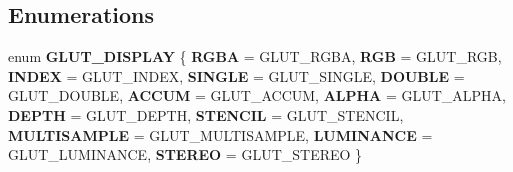 \subsection*{Enumerations}
\begin{DoxyCompactItemize}
\item 
\mbox{\label{namespacetwod_a34520984b2b88af95d23ce0752242265}} 
enum {\bfseries G\+L\+U\+T\+\_\+\+D\+I\+S\+P\+L\+AY} \{ \newline
{\bfseries R\+G\+BA} = G\+L\+U\+T\+\_\+\+R\+G\+BA, 
{\bfseries R\+GB} = G\+L\+U\+T\+\_\+\+R\+GB, 
{\bfseries I\+N\+D\+EX} = G\+L\+U\+T\+\_\+\+I\+N\+D\+EX, 
{\bfseries S\+I\+N\+G\+LE} = G\+L\+U\+T\+\_\+\+S\+I\+N\+G\+LE, 
\newline
{\bfseries D\+O\+U\+B\+LE} = G\+L\+U\+T\+\_\+\+D\+O\+U\+B\+LE, 
{\bfseries A\+C\+C\+UM} = G\+L\+U\+T\+\_\+\+A\+C\+C\+UM, 
{\bfseries A\+L\+P\+HA} = G\+L\+U\+T\+\_\+\+A\+L\+P\+HA, 
{\bfseries D\+E\+P\+TH} = G\+L\+U\+T\+\_\+\+D\+E\+P\+TH, 
\newline
{\bfseries S\+T\+E\+N\+C\+IL} = G\+L\+U\+T\+\_\+\+S\+T\+E\+N\+C\+IL, 
{\bfseries M\+U\+L\+T\+I\+S\+A\+M\+P\+LE} = G\+L\+U\+T\+\_\+\+M\+U\+L\+T\+I\+S\+A\+M\+P\+LE, 
{\bfseries L\+U\+M\+I\+N\+A\+N\+CE} = G\+L\+U\+T\+\_\+\+L\+U\+M\+I\+N\+A\+N\+CE, 
{\bfseries S\+T\+E\+R\+EO} = G\+L\+U\+T\+\_\+\+S\+T\+E\+R\+EO
 \}
\end{DoxyCompactItemize}
